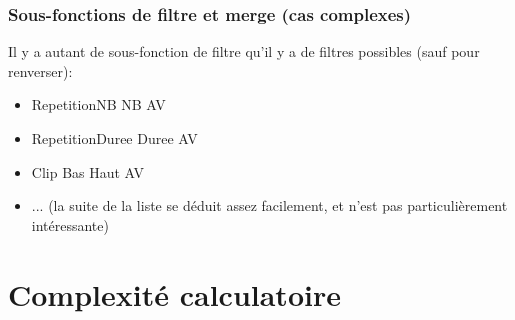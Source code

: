 \documentclass[12pt,a4paper]{article}
\begin{document}
\subsubsection{Sous-fonctions de filtre et merge (cas complexes)}
Il y a autant de sous-fonction de filtre qu'il y a de filtres possibles (sauf pour renverser):
\begin{itemize}
	\item  {RepetitionNB NB AV}
	\item {RepetitionDuree Duree AV}
	\item {Clip Bas Haut AV}
	\item ... (la suite de la liste se déduit assez facilement, et n'est pas particulièrement intéressante)
\end{itemize}

\section{Complexité calculatoire}
\end{document}
